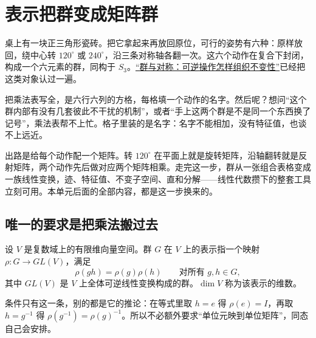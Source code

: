 \section{表示把群变成矩阵群}
\label{sec:04-Discrete-Mathematics/09-Representation-Theory/01}

桌上有一块正三角形瓷砖。把它拿起来再放回原位，可行的姿势有六种：原样放回，绕中心转 \(120^\circ\) 或 \(240^\circ\)，沿三条对称轴各翻一次。这六个动作在复合下封闭，构成一个六元素的群，同构于 \(S_3\)。\hyperref[ch:032]{``群与对称：可逆操作怎样组织不变性''}已经把这类对象认过一遍。

把乘法表写全，是六行六列的方格，每格填一个动作的名字。然后呢？想问``这个群内部有没有几套彼此不干扰的机制''，或者``手上这两个群是不是同一个东西换了记号''，乘法表帮不上忙。格子里装的是名字：名字不能相加，没有特征值，也谈不上远近。

出路是给每个动作配一个矩阵。转 \(120^\circ\) 在平面上就是旋转矩阵，沿轴翻转就是反射矩阵，两个动作先后做对应两个矩阵相乘。走完这一步，群从一张组合表格变成一族线性变换，迹、特征值、不变子空间、直和分解——线性代数攒下的整套工具立刻可用。本单元后面的全部内容，都是这一步换来的。

\subsection{唯一的要求是把乘法搬过去}

\begin{definition}
设 \(V\) 是复数域上的有限维向量空间。群 \(G\) 在 \(V\) 上的表示指一个映射 \(\rho:G\to GL(V)\)，满足
\[
\rho(gh)=\rho(g)\rho(h)
\qquad\text{对所有 }g,h\in G,
\]
其中 \(GL(V)\) 是 \(V\) 上全体可逆线性变换构成的群。\(\dim V\) 称为该表示的维数。
\end{definition}

条件只有这一条，别的都是它的推论：在等式里取 \(h=e\) 得 \(\rho(e)=I\)，再取 \(h=g^{-1}\) 得 \(\rho(g^{-1})=\rho(g)^{-1}\)。所以不必额外要求``单位元映到单位矩阵''，同态自己会安排。

